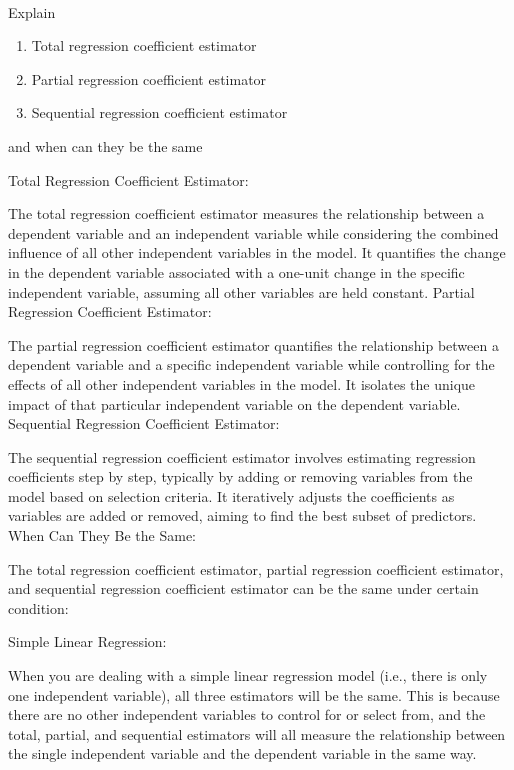 \documentclass[UTF8,a4paper,10pt]{article}
\begin{document}
  \begin{solution}\,\\


  \end{solution}


  \begin{Problem}[]{}
    Explain
    \begin{enumerate}
      \item Total regression coefficient estimator
      \item Partial regression coefficient estimator
      \item Sequential regression coefficient estimator
    \end{enumerate}
    and when can they be the same
  \end{Problem} 

  \begin{solution}
    
Total Regression Coefficient Estimator:

The total regression coefficient estimator measures the relationship between a dependent variable and an independent variable while considering the combined influence of all other independent variables in the model. It quantifies the change in the dependent variable associated with a one-unit change in the specific independent variable, assuming all other variables are held constant.
Partial Regression Coefficient Estimator:

The partial regression coefficient estimator quantifies the relationship between a dependent variable and a specific independent variable while controlling for the effects of all other independent variables in the model. It isolates the unique impact of that particular independent variable on the dependent variable.
Sequential Regression Coefficient Estimator:

The sequential regression coefficient estimator involves estimating regression coefficients step by step, typically by adding or removing variables from the model based on selection criteria. It iteratively adjusts the coefficients as variables are added or removed, aiming to find the best subset of predictors.
When Can They Be the Same:

The total regression coefficient estimator, partial regression coefficient estimator, and sequential regression coefficient estimator can be the same under certain condition:

Simple Linear Regression:

When you are dealing with a simple linear regression model (i.e., there is only one independent variable), all three estimators will be the same. This is because there are no other independent variables to control for or select from, and the total, partial, and sequential estimators will all measure the relationship between the single independent variable and the dependent variable in the same way.
    
  \end{solution}
\end{document}
